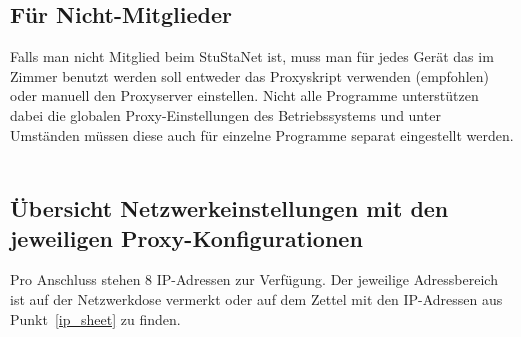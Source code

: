 \documentclass[a4paper,12pt]{scrartcl}
\begin{document}
\subsection{Für Nicht-Mitglieder}
Falls man nicht Mitglied beim StuStaNet ist, muss man für jedes Gerät das im Zimmer benutzt werden soll entweder das Proxyskript verwenden (empfohlen) oder manuell den Proxyserver einstellen.
Nicht alle Programme unterstützen dabei die globalen Proxy-Einstellungen des Betriebssystems und unter Umständen müssen diese auch für einzelne Programme separat eingestellt werden.
\\
\\
\noindent\begin{minipage}{\textwidth}

\subsection{Übersicht Netzwerkeinstellungen mit den jeweiligen Proxy-Konfigurationen}
\label{subsec_settings}
Pro Anschluss stehen 8 IP-Adressen zur Verfügung. Der jeweilige Adressbereich ist auf der Netzwerkdose vermerkt oder auf dem Zettel mit den IP-Adressen aus Punkt~\ref{ip_sheet} zu finden.


\end{minipage}
\end{document}
